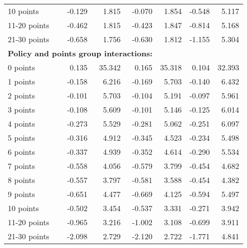 \begin{table}
\begin{tabular}{l r r r r r r}
10 points  & -0.129  &  1.815  & -0.070  &  1.854  & -0.548  &  5.117   \\ 
 
11-20 points  & -0.462  &  1.815  & -0.423  &  1.847  & -0.814  &  5.168   \\ 
 
21-30 points  & -0.658  &  1.756  & -0.630  &  1.812  & -1.155  &  5.304   \\ 
 

\hline 
 
\multicolumn{4}{l}{\textbf{Policy and points group interactions:}}  \\ 
 
0 points  &  0.135  & 35.342  &  0.165  & 35.318  &  0.104  & 32.393   \\ 
 
1 points  & -0.158  &  6.216  & -0.169  &  5.703  & -0.140  &  6.432   \\ 
 
2 points  & -0.101  &  5.703  & -0.104  &  5.191  & -0.097  &  5.961   \\ 
 
3 points  & -0.108  &  5.609  & -0.101  &  5.146  & -0.125  &  6.014   \\ 
 
4 points  & -0.273  &  5.529  & -0.281  &  5.062  & -0.251  &  6.097   \\ 
 
5 points  & -0.316  &  4.912  & -0.345  &  4.523  & -0.234  &  5.498   \\ 
 
6 points  & -0.337  &  4.939  & -0.352  &  4.614  & -0.290  &  5.534   \\ 
 
7 points  & -0.558  &  4.056  & -0.579  &  3.799  & -0.454  &  4.682   \\ 
 
8 points  & -0.557  &  3.797  & -0.581  &  3.588  & -0.454  &  4.382   \\ 
 
9 points  & -0.651  &  4.477  & -0.669  &  4.125  & -0.594  &  5.497   \\ 
 
10 points  & -0.502  &  3.454  & -0.537  &  3.331  & -0.271  &  3.942   \\ 
 
11-20 points  & -0.965  &  3.216  & -1.002  &  3.108  & -0.699  &  3.911   \\ 
 
21-30 points  & -2.098  &  2.729  & -2.120  &  2.722  & -1.771  &  4.841   \\ 
 

\end{tabular}
\end{table}
